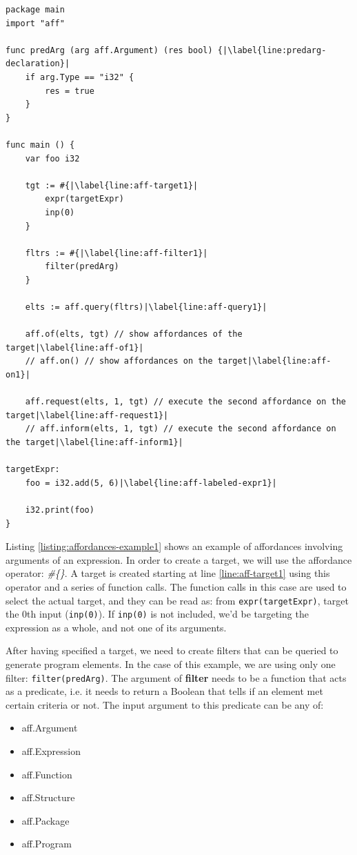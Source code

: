 \documentclass[11pt,fleqn,openany]{book} %
\begin{document}
\begin{lstlisting}[caption={Using affordances on an expression},captionpos=b,label={listing:affordances-example1}]
package main
import "aff"

func predArg (arg aff.Argument) (res bool) {|\label{line:predarg-declaration}|
	if arg.Type == "i32" {
		res = true
	}
}

func main () {
	var foo i32
	
	tgt := #{|\label{line:aff-target1}|
		expr(targetExpr)
		inp(0)
	}

	fltrs := #{|\label{line:aff-filter1}|
		filter(predArg)
	}
	
	elts := aff.query(fltrs)|\label{line:aff-query1}|

	aff.of(elts, tgt) // show affordances of the target|\label{line:aff-of1}|
	// aff.on() // show affordances on the target|\label{line:aff-on1}|
	
	aff.request(elts, 1, tgt) // execute the second affordance on the target|\label{line:aff-request1}|
	// aff.inform(elts, 1, tgt) // execute the second affordance on the target|\label{line:aff-inform1}|

targetExpr:
	foo = i32.add(5, 6)|\label{line:aff-labeled-expr1}|

	i32.print(foo)
}
\end{lstlisting}

Listing \ref{listing:affordances-example1} shows an example of affordances involving arguments of an expression. In order to create a target, we will use the affordance operator: \emph{\#\{\}}. A target is created starting at line \ref{line:aff-target1} using this operator and a series of function calls. The function calls in this case are used to select the actual target, and they can be read as: from \lstinline{expr(targetExpr)}, target the 0th input (\lstinline{inp(0)}). If \lstinline{inp(0)} is not included, we'd be targeting the expression as a whole, and not one of its arguments.

After having specified a target, we need to create filters that can be queried to generate program elements. In the case of this example, we are using only one filter: \lstinline{filter(predArg)}. The argument of \textbf{filter} needs to be a function that acts as a predicate, i.e. it needs to return a Boolean that tells if an element met certain criteria or not. The input argument to this predicate can be any of:

\begin{itemize}
    \item aff.Argument
    \item aff.Expression
    \item aff.Function
    \item aff.Structure
    \item aff.Package
    \item aff.Program
\end{itemize}
\end{document}
